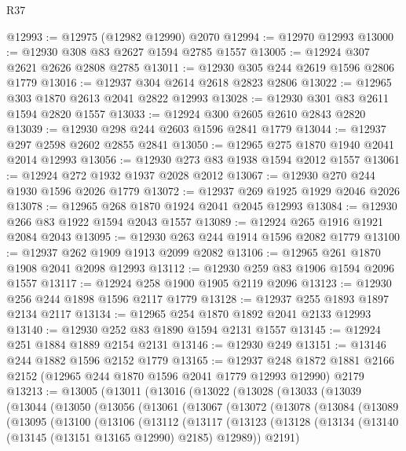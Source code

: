 \begin{lexlean}{R37}
\begin{coremodule}
@12993 := @12975 (@12982 @12990) @2070
@12994 := @12970 @12993
@13000 := @12930 @308 @83 @2627 @1594 @2785 @1557
@13005 := @12924 @307 @2621 @2626 @2808 @2785
@13011 := @12930 @305 @244 @2619 @1596 @2806 @1779
@13016 := @12937 @304 @2614 @2618 @2823 @2806
@13022 := @12965 @303 @1870 @2613 @2041 @2822 @12993
@13028 := @12930 @301 @83 @2611 @1594 @2820 @1557
@13033 := @12924 @300 @2605 @2610 @2843 @2820
@13039 := @12930 @298 @244 @2603 @1596 @2841 @1779
@13044 := @12937 @297 @2598 @2602 @2855 @2841
@13050 := @12965 @275 @1870 @1940 @2041 @2014 @12993
@13056 := @12930 @273 @83 @1938 @1594 @2012 @1557
@13061 := @12924 @272 @1932 @1937 @2028 @2012
@13067 := @12930 @270 @244 @1930 @1596 @2026 @1779
@13072 := @12937 @269 @1925 @1929 @2046 @2026
@13078 := @12965 @268 @1870 @1924 @2041 @2045 @12993
@13084 := @12930 @266 @83 @1922 @1594 @2043 @1557
@13089 := @12924 @265 @1916 @1921 @2084 @2043
@13095 := @12930 @263 @244 @1914 @1596 @2082 @1779
@13100 := @12937 @262 @1909 @1913 @2099 @2082
@13106 := @12965 @261 @1870 @1908 @2041 @2098 @12993
@13112 := @12930 @259 @83 @1906 @1594 @2096 @1557
@13117 := @12924 @258 @1900 @1905 @2119 @2096
@13123 := @12930 @256 @244 @1898 @1596 @2117 @1779
@13128 := @12937 @255 @1893 @1897 @2134 @2117
@13134 := @12965 @254 @1870 @1892 @2041 @2133 @12993
@13140 := @12930 @252 @83 @1890 @1594 @2131 @1557
@13145 := @12924 @251 @1884 @1889 @2154 @2131
@13146 := @12930 @249
@13151 := @13146 @244 @1882 @1596 @2152 @1779
@13165 := @12937
    @248
    @1872
    @1881
    @2166
    @2152
    (@12965 @244 @1870 @1596 @2041 @1779 @12993 @12990)
    @2179
@13213 := @13005
    (@13011
      (@13016
        (@13022
          (@13028
            (@13033
              (@13039
                (@13044
                  (@13050
                    (@13056
                      (@13061
                        (@13067
                          (@13072
                            (@13078
                              (@13084
                                (@13089
                                  (@13095
                                    (@13100
                                      (@13106
                                        (@13112
                                          (@13117
                                            (@13123
                                              (@13128
                                                (@13134
                                                  (@13140
                                                    (@13145 (@13151 @13165 @12990) @2185)
                                                    @12989))
                                                @2191)

\end{coremodule}
\end{lexlean}
